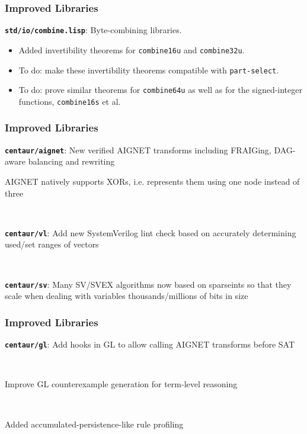 \documentclass{beamer}
\newcommand{\code}[1]{\texttt{#1}}
\newcommand{\bookpath}[1]{\textbf{\code{#1}}}
\newcommand{\implibtitle}{\frametitle{Improved Libraries}}
\begin{document}

\begin{frame}

\implibtitle

\bookpath{std/io/combine.lisp}:
Byte-combining libraries.
\begin{itemize}
\item
Added invertibility theorems for \code{combine16u} and \code{combine32u}.
\item
To do: make these invertibility theorems compatible with \code{part-select}.
\item
To do: prove similar theorems for \code{combine64u} as well as for the
signed-integer functions, \code{combine16s} et al.
\end{itemize}

\end{frame}


\begin{frame}

\implibtitle

\bookpath{centaur/aignet}:
New verified AIGNET transforms including FRAIGing, DAG-aware balancing and rewriting

AIGNET natively supports XORs, i.e. represents them using one node instead of three

\

\bookpath{centaur/vl}:
Add new SystemVerilog lint check based on accurately determining
used/set ranges of vectors

\

\bookpath{centaur/sv}:
Many SV/SVEX algorithms now based on sparseints so that they scale
when dealing with variables thousands/millions of bits in size

\end{frame}


\begin{frame}

\implibtitle

\bookpath{centaur/gl}:
Add hooks in GL to allow calling AIGNET transforms before SAT

\

Improve GL counterexample generation for term-level reasoning

\

Added accumulated-persistence-like rule profiling

\end{frame}
\end{document}
